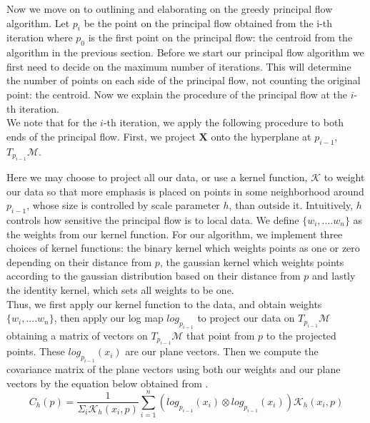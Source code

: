 \documentclass[12pt]{report}
\begin{document}
Now we move on to outlining and elaborating on the greedy principal flow algorithm.
Let $p_i$ be the point on the principal flow
obtained from the i-th iteration where $p_0$ is the 
first point on the principal flow: the centroid from the 
algorithm in the previous section. Before we start our principal flow
algorithm we first need to decide on the maximum number of iterations. 
This will determine the number of points on each side of the principal flow, 
not counting the original point: the centroid.
Now we explain the procedure of the principal flow at the $i$-th iteration.\\
We note that for the $i$-th iteration, we apply the following procedure
to both ends of the principal flow.
First, we project $\mathbf{X}$ onto the hyperplane
at $p_{i-1}$, $T_{p_{i-1}}\mathcal{M}$.

Here we may choose to project all our data, or use a kernel function, 
$\mathcal{K}$ to weight our data so that more emphasis is 
placed on points in some neighborhood around
$p_{i-1}$, whose size is controlled by scale parameter $h$, than outside it.
Intuitively, $h$ controls how sensitive the principal flow is to local data.
We define $\{w_i,....w_n\}$ as the weights from our kernel function.
For our algorithm, we implement three choices of kernel functions: the binary kernel 
which weights points as one or zero depending on their distance from 
$p$, the gaussian kernel which weights points according to 
the gaussian distribution based on their distance from $p$ and
lastly the identity kernel, which sets all weights to be one.\\
Thus, we first apply our kernel function to the data, and obtain weights 
$\{w_i,....w_n\}$, then apply our log map $log_{p_{i-1}}$ to project our data on 
$T_{p_{i-1}}\mathcal{M}$ obtaining a matrix of vectors on 
$T_{p_{i-1}}\mathcal{M}$ that point from $p$
to the projected points. These $log_{p_{i-1}}(x_i)$ are our plane vectors.
Then we compute the covariance matrix of the plane vectors
using both our weights and our plane vectors
by the equation below obtained from \cite{principalflow}.
$$C_h(p) = \frac{1}{\Sigma_i \mathcal{K}_h(x_i,p)}\sum^n_{i=1}(log_{p_{i-1}}(x_i)\otimes log_{p_{i-1}}(x_i))\mathcal{K}_h(x_i,p)$$
\end{document}
